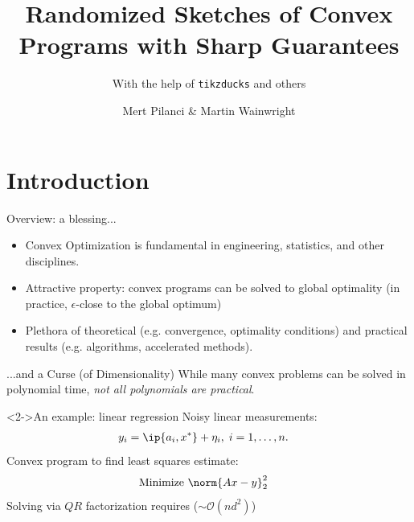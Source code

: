 \documentclass[10pt]{beamer}
\begin{document}
\title{Randomized Sketches of Convex Programs with Sharp Guarantees}
\subtitle{With the help of \texttt{tikzducks} and others}
\author{Mert Pilanci \& Martin Wainwright}
\frame{\titlepage}
\frame{\tableofcontents}

\section{Introduction}
\begin{frame}{Overview: a blessing...}
    \begin{itemize}
    \item<1-> Convex Optimization is fundamental in engineering,
    statistics, and other disciplines.
    \item<2-> Attractive property: convex programs can be solved to global
    optimality (in practice, $\epsilon$-close to the global optimum)
    \item<3-> Plethora of theoretical (e.g. convergence, optimality conditions)
    and practical results (e.g. algorithms, accelerated methods).
    \end{itemize}
\end{frame}
%
\begin{frame}{...and a Curse (of Dimensionality)}
    While many convex problems can be solved in polynomial time, \textit{not
    all polynomials are practical}.
    \linebreak
    \begin{block}<2->{An example: linear regression}
        Noisy linear measurements:
        \begin{align*}
            y_i &= \ip{a_i, x^*} + \eta_i, \; i = 1, \dots, n.
        \end{align*}
        Convex program to find least squares estimate:
        \begin{align*}
            \mbox{Minimize } & \norm{Ax - y}_2^2
        \end{align*}
        Solving via $QR$ factorization requires
        ($\sim \mathcal{O}(nd^2)$)
    \end{block}
\end{frame}
\end{document}
